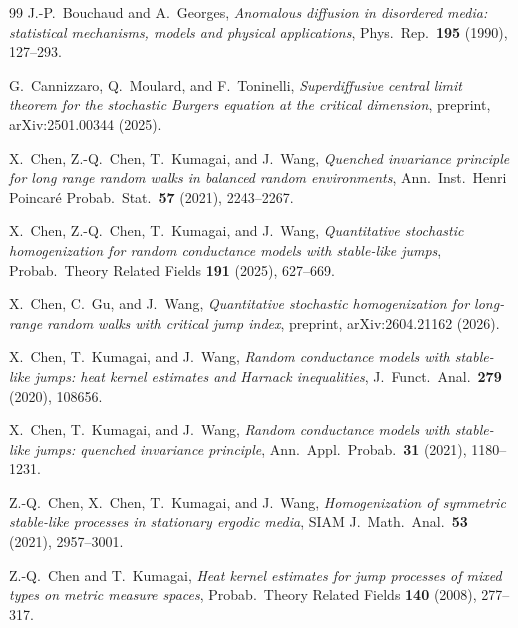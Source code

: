\documentclass[11pt]{amsart}
\numberwithin{equation}{section}
\begin{document}
\begin{thebibliography}{99}
J.-P.~Bouchaud and A.~Georges,
\emph{Anomalous diffusion in disordered media: statistical mechanisms, models and physical applications},
Phys.\ Rep.\ \textbf{195} (1990), 127--293.

G.~Cannizzaro, Q.~Moulard, and F.~Toninelli,
\emph{Superdiffusive central limit theorem for the stochastic Burgers equation at the critical dimension},
preprint, arXiv:2501.00344 (2025).

X.~Chen, Z.-Q.~Chen, T.~Kumagai, and J.~Wang,
\emph{Quenched invariance principle for long range random walks in balanced random environments},
Ann.\ Inst.\ Henri Poincar\'e Probab.\ Stat.\ \textbf{57} (2021), 2243--2267.

X.~Chen, Z.-Q.~Chen, T.~Kumagai, and J.~Wang,
\emph{Quantitative stochastic homogenization for random conductance models with stable-like jumps},
Probab.\ Theory Related Fields \textbf{191} (2025), 627--669.

X.~Chen, C.~Gu, and J.~Wang,
\emph{Quantitative stochastic homogenization for long-range random walks with critical jump index},
preprint, arXiv:2604.21162 (2026).

X.~Chen, T.~Kumagai, and J.~Wang,
\emph{Random conductance models with stable-like jumps: heat kernel estimates and Harnack inequalities},
J.\ Funct.\ Anal.\ \textbf{279} (2020), 108656.

X.~Chen, T.~Kumagai, and J.~Wang,
\emph{Random conductance models with stable-like jumps: quenched invariance principle},
Ann.\ Appl.\ Probab.\ \textbf{31} (2021), 1180--1231.

Z.-Q.~Chen, X.~Chen, T.~Kumagai, and J.~Wang,
\emph{Homogenization of symmetric stable-like processes in stationary ergodic media},
SIAM J.\ Math.\ Anal.\ \textbf{53} (2021), 2957--3001.

Z.-Q.~Chen and T.~Kumagai,
\emph{Heat kernel estimates for jump processes of mixed types on metric measure spaces},
Probab.\ Theory Related Fields \textbf{140} (2008), 277--317.


\end{thebibliography}
\end{document}
